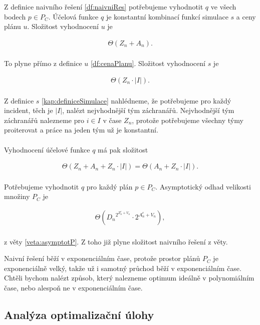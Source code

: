 \begin{dukaz}
  Z definice naivního řešení \ref{df:naivniRes} potřebujeme vyhodnotit $q$ ve všech bodech $p \in P_C$.
  Účelová funkce $q$ je konstantní kombinací funkcí simulace $s$ a ceny plánu $u$. Složitost vyhodnocení $u$ je

  \begin{align*}
    \Theta (Z_n + A_n).
  \end{align*}
  \\
  To plyne přímo z definice $u$ \ref{df:cenaPlanu}. Složitost vyhodnocení $s$ je

  \begin{align*}
    \Theta (Z_n \cdot |I|).
  \end{align*}
  \\
  Z definice $s$ \ref{kap:definiceSimulace} nahlédneme, že potřebujeme pro každý incident, těch je $|I|$, nalézt nejvhodnější tým záchranářů.
  Nejvhodnější tým záchranářů nalezneme pro $i \in I$ v čase $Z_n$, protože potřebujeme všechny týmy proiterovat a práce na jeden tým už je konstantní.
  \\
  \\
  Vyhodnocení účelové funkce $q$ má pak složitost

  \begin{align*}
    \Theta (Z_n + A_n + Z_n \cdot |I|) = \Theta (A_n + Z_n \cdot |I|).
  \end{align*}
  \\
  Potřebujeme vyhodnotit $q$ pro každý plán $p \in P_C$.
  Asymptotický odhad velikosti množiny $P_C$ je 

  \begin{align*}
    \Theta ({D_n}^{2^{Z^c_n + V_n}} \cdot 2^{A^c_n + V_n}),
  \end{align*}
  \\
  z věty \ref{veta:asymptotP}. Z toho již plyne složitost naivního řešení z věty.
  \\
\end{dukaz}

Naivní řešení běží v exponenciálním čase, protože prostor plánů $P_C$ je exponenciálně velký, takže už i samotný průchod běží v exponenciálním čase.
Chtěli bychom nalézt způsob, který nalezneme optimum ideálně v polynomiálním čase, nebo alespoň ne v exponenciálním čase.

\subsection{Analýza optimalizační úlohy}


